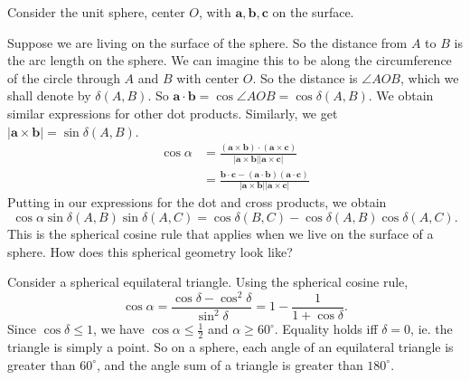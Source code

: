 \documentclass[a4paper]{article}
\begin{document}
Consider the unit sphere, center $O$, with $\mathbf{a, b, c}$ on the surface.
\begin{center}
\end{center}
Suppose we are living on the surface of the sphere. So the distance from $A$ to $B$ is the arc length on the sphere. We can imagine this to be along the circumference of the circle through $A$ and $B$ with center $O$. So the distance is $\angle AOB$, which we shall denote by $\delta (A, B)$. So $\mathbf{a}\cdot \mathbf{b} = \cos \angle AOB = \cos \delta (A, B)$. We obtain similar expressions for other dot products. Similarly, we get $|\mathbf{a}\times \mathbf{b}| = \sin \delta(A, B)$.
\begin{align*}
  \cos \alpha &= \mathbf{\frac{(a\times b)\cdot(a\times c)}{|a\times b||a\times c|}}\\
  &= \mathbf{\frac{b\cdot c - (a\cdot b)(a\cdot c)}{|a\times b||a\times c|}}
\end{align*}
Putting in our expressions for the dot and cross products, we obtain
\[
  \cos\alpha\sin\delta(A, B)\sin\delta(A, C) = \cos\delta(B, C) - \cos\delta(A, B)\cos\delta(A, C).
\]
This is the spherical cosine rule that applies when we live on the surface of a sphere. How does this spherical geometry look like?

Consider a spherical equilateral triangle. Using the spherical cosine rule,
\[
  \cos\alpha = \frac{\cos\delta - \cos^2\delta}{\sin^2\delta} = 1 - \frac{1}{1 + \cos\delta}.
\]
Since $\cos\delta\leq 1$, we have $\cos\alpha\leq \frac{1}{2}$ and $\alpha \geq 60^\circ$. Equality holds iff $\delta = 0$, ie. the triangle is simply a point. So on a sphere, each angle of an equilateral triangle is greater than $60^\circ$, and the angle sum of a triangle is greater than $180^\circ$.
\end{document}
